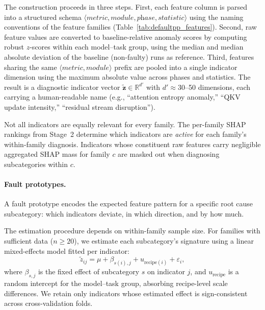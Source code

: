 The construction proceeds in three steps. First, each feature column is parsed into a structured schema $\langle\textit{metric}, \textit{module}, \textit{phase}, \textit{statistic}\rangle$ using the naming conventions of the feature families (Table~\ref{tab:defaultpp_features}). Second, raw feature values are converted to baseline-relative anomaly scores by computing robust $z$-scores within each model--task group, using the median and median absolute deviation of the baseline (non-faulty) runs as reference. Third, features sharing the same $\langle\textit{metric}, \textit{module}\rangle$ prefix are pooled into a single indicator dimension using the maximum absolute value across phases and statistics. The result is a diagnostic indicator vector $\tilde{\mathbf{z}} \in \mathbb{R}^{d'}$ with $d' \approx 30$--50 dimensions, each carrying a human-readable name (e.g., ``attention entropy anomaly,'' ``QKV update intensity,'' ``residual stream disruption'').

Not all indicators are equally relevant for every family. The per-family SHAP rankings from Stage~2 determine which indicators are \emph{active} for each family's within-family diagnosis. Indicators whose constituent raw features carry negligible aggregated SHAP mass for family $c$ are masked out when diagnosing subcategories within $c$.

\paragraph{Fault prototypes.}
\label{sec:defaultpp_signatures}

A fault prototype encodes the expected feature pattern for a specific root cause subcategory: which indicators deviate, in which direction, and by how much.

The estimation procedure depends on within-family sample size. For families with sufficient data ($n \geq 20$), we estimate each subcategory's signature using a linear mixed-effects model fitted per indicator:
\begin{equation}
\tilde{z}_{ij} = \mu + \beta_{s(i),j} + u_{\text{recipe}(i)} + \varepsilon_i,
\label{eq:mixed_effects}
\end{equation}
where $\beta_{s,j}$ is the fixed effect of subcategory $s$ on indicator $j$, and $u_{\text{recipe}}$ is a random intercept for the model--task group, absorbing recipe-level scale differences. We retain only indicators whose estimated effect is sign-consistent across cross-validation folds.

